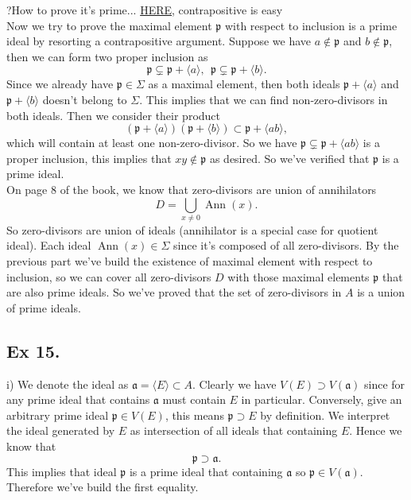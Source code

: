 ?How to prove it's prime... \href{https://math.stackexchange.com/questions/44481/showing-the-set-of-zero-divisors-is-a-union-of-prime-ideals}{HERE}, contrapositive is easy \\

Now we try to prove the maximal element $\mathfrak p$ with respect to inclusion is a prime ideal by resorting a contrapositive argument.
Suppose we have $a\notin \mathfrak p$ and $b\notin\mathfrak p$, then we can form two proper inclusion as
$$\mathfrak p\subsetneq \mathfrak p+\langle a\rangle,~~ \mathfrak p\subsetneq \mathfrak p+\langle b\rangle.$$
Since we already have $\mathfrak p\in\Sigma$ as a maximal element, then both ideals $\mathfrak p+\langle a\rangle$ and $\mathfrak p+\langle b\rangle$ doesn't belong to $\Sigma$. This implies that we can find non-zero-divisors in both ideals. Then we consider their product
$$(\mathfrak p+\langle a\rangle)(\mathfrak p+\langle b\rangle)\subset \mathfrak p+\langle ab\rangle,$$ which will contain at least one non-zero-divisor. So we have $\mathfrak p\subsetneq\mathfrak p+\langle ab\rangle$ is a proper inclusion, this implies that $xy\notin \mathfrak p$ as desired. So we've verified that $\mathfrak p$ is a prime ideal.\\

On page 8 of the book, we know that zero-divisors are union of annihilators 
$$D=\bigcup_{x\neq 0} \operatorname{Ann}(x).$$ So zero-divisors are union of ideals (annihilator is a special case for quotient ideal). Each ideal $\operatorname{Ann}(x)\in \Sigma$ since it's composed of all zero-divisors. By the previous part we've build the existence of maximal element with respect to inclusion, so we can cover all zero-divisors $D$ with those maximal elements $\mathfrak p$ that are also prime ideals. So we've proved that the set of zero-divisors in $A$ is a union of prime ideals.

\subsection{Ex 15.}

i) We denote the ideal as $\mathfrak a=\langle E\rangle \subset A$.
Clearly we have $V(E)\supset V(\mathfrak a)$ since for any prime ideal that contains $\mathfrak a$ must contain $E$ in particular. Conversely, give an arbitrary prime ideal $\mathfrak p\in V(E)$, this means $\mathfrak p\supset E$ by definition. We interpret the ideal generated by $E$ as intersection of all ideals that containing $E$. Hence we know that 
$$\mathfrak p\supset \mathfrak a.$$ This implies that ideal $\mathfrak p$ is a prime ideal that containing $\mathfrak a$ so $\mathfrak p\in V(\mathfrak a)$. Therefore we've build the first equality.\\

